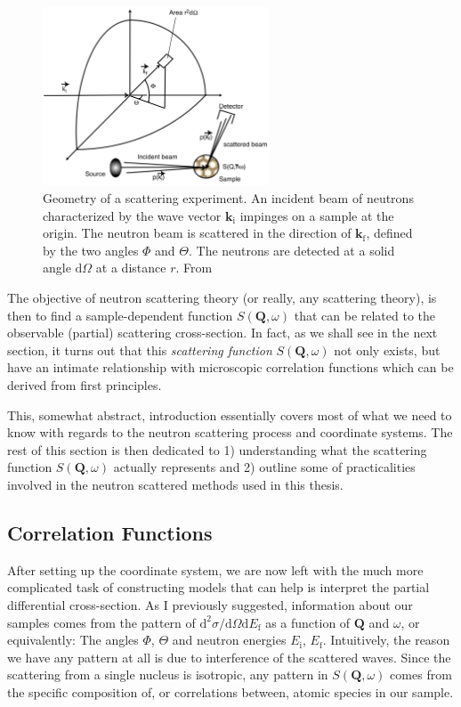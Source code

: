 \begin{figure}
	\centering
	\includegraphics[width=0.6\textwidth]{fig/method/ns/dsdo_schober.png}
	\caption[scattering cross-section geometry]{Geometry of a scattering experiment. An incident beam of neutrons characterized by the wave vector $\bm{k}_\text{i}$ impinges on a sample at the origin. The neutron beam is scattered in the direction of $\bm{k}_\text{f}$, defined by the two angles $\Phi$ and $\Theta$. The neutrons are detected at a solid angle $\mathrm{d}\Omega$ at a distance $r$. From \cite{Schober2014}}
	\label{fig:dsdo_geometry}
\end{figure}

The objective of neutron scattering theory (or really, any scattering theory), is then to find a sample-dependent function $S(\bm{Q}, \omega)$ that can be related to the observable (partial) scattering cross-section. In fact, as we shall see in the next section, it turns out that this \emph{scattering function} $S(\bm{Q}, \omega)$ not only exists, but have an intimate relationship with microscopic correlation functions which can be derived from first principles. 

This, somewhat abstract, introduction essentially covers most of what we need to know with regards to the neutron scattering process and coordinate systems. The rest of this section is then dedicated to 1) understanding what the scattering function $S(\bm{Q}, \omega)$ actually represents and 2) outline some of practicalities involved in the neutron scattered methods used in this thesis. 

\subsection{Correlation Functions}
After setting up the coordinate system, we are now left with the much more complicated task of constructing models that can help is interpret the partial differential cross-section. As I previously suggested, information about our samples comes from the pattern of $\mathrm{d}^2 \sigma / \mathrm{d}\Omega \mathrm{d}E_\text{f}$ as a function of $\bm{Q}$ and $\omega$, or equivalently: The angles $\Phi$, $\Theta$ and neutron energies $E_\text{i}$, $E_\text{f}$. Intuitively, the reason we have any pattern  at all is due to interference of the scattered waves. Since the scattering from a single nucleus is isotropic, any pattern in $S(\bm{Q}, \omega)$ comes from the specific composition of, or correlations between, atomic species in our sample. 

